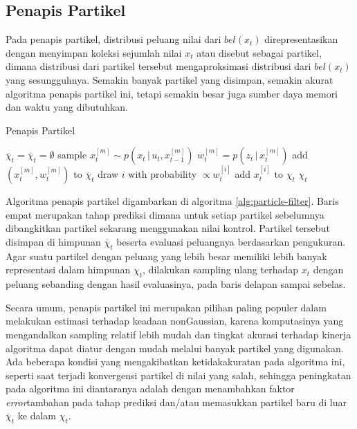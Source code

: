 \subsection{Penapis Partikel}

Pada penapis partikel, distribusi peluang nilai dari $bel(x_t)$ direpresentasikan dengan menyimpan koleksi sejumlah nilai $x_t$ atau disebut sebagai partikel, dimana distribusi dari partikel tersebut mengaproksimasi distribusi dari $bel(x_t)$ yang sesungguhnya. Semakin banyak partikel yang disimpan, semakin akurat algoritma penapis partikel ini, tetapi semakin besar juga sumber daya memori dan waktu yang dibutuhkan.

\begin{algorithm}
    \caption{Penapis Partikel}
    \label{alg:particle-filter}
    \begin{algorithmic}[1]
        \State $\overline{\chi}_t= \overline{\chi}_t = \emptyset$
        \State sample $x_t^{[m]} \sim p(x_t \,|\, u_t, x_{t-1}^{[m]})$
        \State $w_t^{[m]} = p(z_t \,|\, x_t^{[m]})$
        \State add $(x_t^{[m]}, w_t^{[m]})$ to $\overline{\chi}_t$
        \EndFor
        \State draw $i$ with probability $\propto w_t^{[i]}$
        \State add $x_t^{[i]}$ to $\chi_t$
        \EndFor
        \State \Return $\chi_t$
        \EndFunction
    \end{algorithmic}
\end{algorithm}

Algoritma penapis partikel digambarkan di algoritma \ref{alg:particle-filter}. Baris empat merupakan tahap prediksi dimana untuk setiap partikel sebelumnya dibangkitkan partikel sekarang menggunakan nilai kontrol. Partikel tersebut disimpan di himpunan $\overline{\chi}_t$ beserta evaluasi peluangnya berdasarkan pengukuran. Agar suatu partikel dengan peluang yang lebih besar memiliki lebih banyak representasi dalam himpunan $\chi_t$, dilakukan sampling ulang terhadap $x_t$ dengan peluang sebanding dengan hasil evaluasinya, pada baris delapan sampai sebelas.

Secara umum, penapis partikel ini merupakan pilihan paling populer dalam melakukan estimasi terhadap keadaan nonGaussian, karena komputasinya yang mengandalkan sampling relatif lebih mudah dan tingkat akurasi terhadap kinerja algoritma dapat diatur dengan mudah melalui banyak partikel yang digunakan. Ada beberapa kondisi yang mengakibatkan ketidakakuratan pada algoritma ini, seperti saat terjadi konvergensi partikel di nilai yang salah, sehingga peningkatan pada algoritma ini diantaranya adalah dengan menambahkan faktor \textit{error}tambahan pada tahap prediksi dan/atau memasukkan partikel baru di luar $\overline{\chi}_t$ ke dalam $\chi_t$.

